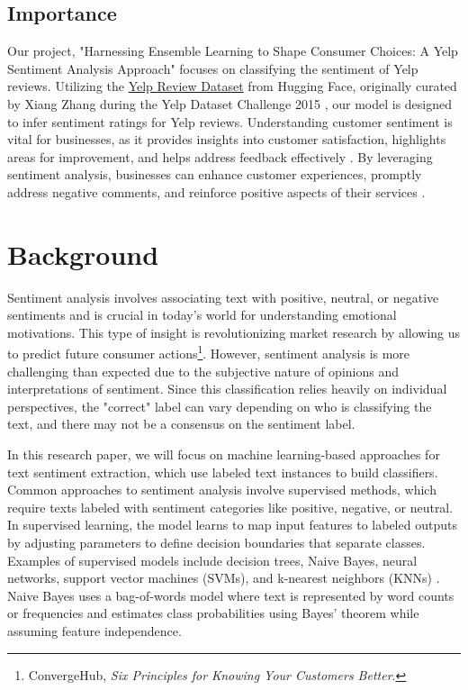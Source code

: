 \documentclass[11pt]{article}
\begin{document}
\subsection{Importance}
Our project, "Harnessing Ensemble Learning to Shape Consumer Choices: A Yelp Sentiment Analysis Approach" focuses on classifying the sentiment of Yelp reviews. Utilizing the \href{https://huggingface.co/datasets/Yelp/yelp_review_full}{Yelp Review Dataset} from Hugging Face, originally curated by Xiang Zhang during the Yelp Dataset Challenge 2015 \citep{zhang2015sensitivity}, our model is designed to infer sentiment ratings for Yelp reviews. Understanding customer sentiment is vital for businesses, as it provides insights into customer satisfaction, highlights areas for improvement, and helps address feedback effectively \citep{jurafsky2020speech}. By leveraging sentiment analysis, businesses can enhance customer experiences, promptly address negative comments, and reinforce positive aspects of their services \citep{pang2008sentiment}.

\section{Background}
Sentiment analysis involves associating text with positive, neutral, or negative sentiments and is crucial in today's world for understanding emotional motivations. This type of insight is revolutionizing market research by allowing us to predict future consumer actions\footnote{ConvergeHub, \textit{Six Principles for Knowing Your Customers Better}.}. However, sentiment analysis is more challenging than expected due to the subjective nature of opinions and interpretations of sentiment. Since this classification relies heavily on individual perspectives, the "correct" label can vary depending on who is classifying the text, and there may not be a consensus on the sentiment label.

In this research paper, we will focus on machine learning-based approaches for text sentiment extraction, which use labeled text instances to build classifiers. Common approaches to sentiment analysis involve supervised methods, which require texts labeled with sentiment categories like positive, negative, or neutral. In supervised learning, the model learns to map input features to labeled outputs by adjusting parameters to define decision boundaries that separate classes. Examples of supervised models include decision trees, Naive Bayes, neural networks, support vector machines (SVMs), and k-nearest neighbors (KNNs) \citep{dankhara2022}. Naive Bayes uses a bag-of-words model where text is represented by word counts or frequencies and estimates class probabilities using Bayes' theorem while assuming feature independence.
\end{document}
